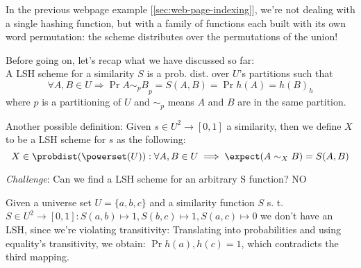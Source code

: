 	\obs In the previous webpage example [\ref{sec:web-page-indexing}], we're not dealing with a single hashing function, but with a family of functions each built with its own word permutation: the scheme distributes over the permutations of the union!
	
	
	Before going on, let's recap what we have discussed so far: \\
	A LSH scheme for a similarity $S$ is a prob. dist. over $U$'s partitions such that 
	\begin{equation}
		\forall A, B \in  U \Rightarrow \Pr{A\sim_p B}_p = S(A, B) = \Pr{h(A)=h(B)}_h
	\end{equation}
	where $p$ is a partitioning of $U$ and $\sim_p$ means $A$ and $B$ are in the same partition.
	
	Another possible definition: Given $s \in U^2 \to [0,1]$ a similarity, then we define $X$ to be a LSH scheme for $s$ as the following:
	\begin{equation}
	X \in \probdist(\powerset(U)) : \forall A, B \in U \implies \expect(A\sim_X B) = S(A, B)
	\end{equation}
	
	\textit{Challenge}: Can we find a LSH scheme for an arbitrary S function? NO
	
	\ex \label{ex:transitivity} Given a universe set $U = \{a, b, c\}$ and a similarity function $S$ s. t.	$S \in U^2 \rightarrow [0, 1] : S(a, b) \mapsto 1, S(b, c) \mapsto 1, S(a, c) \mapsto 0$ we don't have an LSH, since we're violating transitivity:
	Translating into probabilities and using equality's transitivity, we obtain: $\Pr{h(a), h(c)}=1$, which contradicts the third mapping.
	